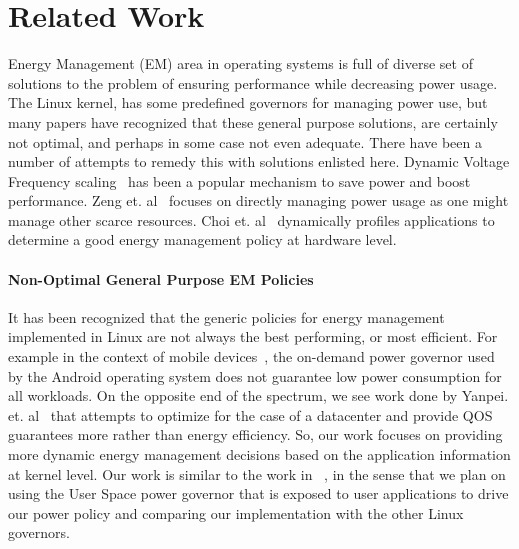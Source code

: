 \section{Related Work}\label{sec:rel}

Energy Management (EM) area in operating systems is full of diverse set of solutions to the problem of ensuring performance while decreasing power usage. The Linux kernel, has some predefined governors for managing power use, but many papers have recognized that these general purpose solutions, are certainly not optimal, and perhaps in some case not even adequate. There have been a number of attempts to remedy this with solutions enlisted here. Dynamic Voltage Frequency scaling~\cite{dvfs} has been a popular mechanism to save power and boost performance. Zeng et. al~\cite{ecos} focuses on directly managing power usage as one might manage other scarce resources. Choi et. al~\cite{decomp} dynamically profiles applications to determine a good energy management policy at hardware level. 

\paragraph{Non-Optimal General Purpose EM Policies} It has been recognized that the generic policies for energy management implemented in Linux are not always the best performing, or most efficient. For example in the context of mobile devices~\cite{and-dvfs}, the on-demand power governor used by the Android operating system does not guarantee low power consumption for all workloads. On the opposite end of the spectrum, we see work done by Yanpei. et. al~\cite{sleepscale} that attempts to optimize for the case of a datacenter and provide QOS guarantees more rather than energy efficiency. So, our work focuses on providing more dynamic energy management decisions based on the application information at kernel level. Our work is similar to the work in ~\cite{and-dvfs}, in the sense that we plan on using the User Space power governor that is exposed to user applications to drive our power policy and comparing our implementation with the other Linux governors. 


